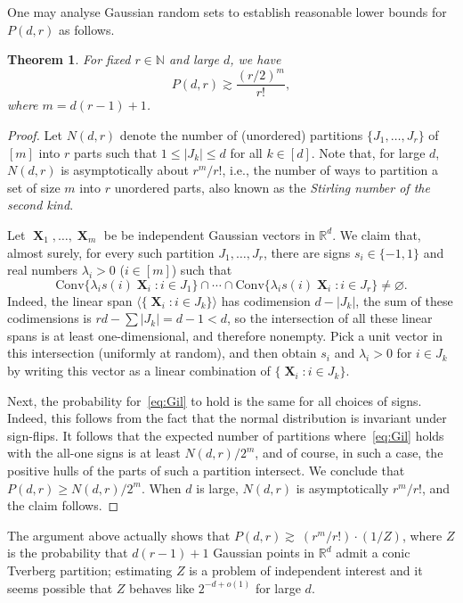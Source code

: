 \documentclass[12pt,english,reqno]{amsart}
\theoremstyle{plain}
\newtheorem{thm}{Theorem}[section]
\theoremstyle{remark}
\numberwithin{figure}{section}
\numberwithin{equation}{section}
\DeclareMathOperator{\Xb}{\mathbf{X}} %
\newcommand{\darkblue}{\color{darkblue}}
\newcommand{\defnb}[1]{\emph{\darkblue #1}}
\begin{document}
One may analyse Gaussian random sets to establish reasonable lower bounds for $P(d,r)$ as follows.
\begin{thm}
For fixed $r \in \mathbb{N}$ and large $d$, we have
\[
	P(d,r) \gtrsim \frac {(r/2)^m}{r!},
\]
where $m=d(r-1)+1$.
\end {thm}
\begin{proof}
Let $N(d,r)$ denote the number of (unordered) partitions $\{J_1,\dots, J_r\}$ of $[m]$ into $r$ parts such that $1 \le |J_k| \le d$ for all $k \in [d]$. Note that, for large \( d \), \( N(d,r) \) is asymptotically about \( r^m / r! \), i.e., the number of ways to partition a set of size \( m \) into \( r \) unordered parts, also known as the \defnb{Stirling number of the second kind}.

Let $\Xb_1,\dots, \Xb_m$ be be independent Gaussian vectors in $ \mathbb R^d$. We claim that, almost surely, for every such partition $ J_1,\dots, J_r$, there are signs $s_i \in \{-1, 1\}$ and real numbers $\lambda_i>0$ ($i \in [m]$) such that
\begin{equation}\label{eq:Gil}
	\text{Conv} \{\lambda_is(i) \Xb_i: i \in J_1\} \cap \cdots \cap \text{Conv} \{\lambda_i s(i) \Xb_i: i \in J_r \} \neq \varnothing.
\end{equation}
Indeed, the linear span $\langle\{\Xb_i: i \in J_k\}\rangle$ has codimension $d-|J_k|$, the sum of these codimensions is $rd-\sum |J_k|=d-1<d$, so the intersection of all these linear spans is at least one-dimensional, and therefore nonempty. Pick a unit vector in this intersection (uniformly at random), and then obtain $s_i$ and $\lambda_i>0$ for $i \in J_k$ by writing this vector as a linear combination of $\{\Xb_i: i \in J_k\}$.

Next, the probability for~\eqref{eq:Gil} to hold is the same for all choices of signs. Indeed, this follows from the fact that the normal distribution is invariant under sign-flips. It follows that the expected number of partitions where~\eqref{eq:Gil} holds with the all-one signs is at least $ N(d,r)/2^m$, and of course, in such a case, the positive hulls of the parts of such a partition intersect. We conclude that $ P(d,r) \ge N(d,r)/2^m$. When $ d$ is large, $ N(d,r)$ is asymptotically $r^m/r!$, and the claim follows.
\end {proof}

The argument above actually shows that $P(d,r) \gtrsim \ ({r^{m}}/{r!}) \cdot ({1}/{Z})$, where $Z$ is the probability that $d(r-1)+1$ Gaussian points in $\mathbb R^d$ admit a conic Tverberg partition; estimating $Z$ is a problem of independent interest and it seems possible that $Z$ behaves like $2^{-d+o(1)}$ for large $d$.
\end{document}
